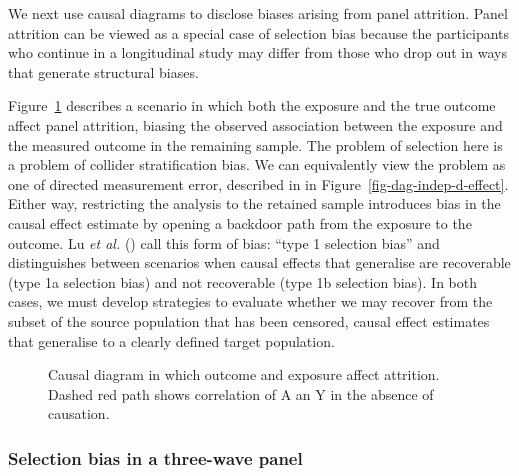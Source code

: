 \documentclass[
  singlecolumn]{article}
\begin{document}
We next use causal diagrams to disclose biases arising from panel
attrition. Panel attrition can be viewed as a special case of selection
bias because the participants who continue in a longitudinal study may
differ from those who drop out in ways that generate structural biases.

Figure~\ref{fig-dag-8-5} describes a scenario in which both the exposure
and the true outcome affect panel attrition, biasing the observed
association between the exposure and the measured outcome in the
remaining sample. The problem of selection here is a problem of collider
stratification bias. We can equivalently view the problem as one of
directed measurement error, described in in
Figure~\ref{fig-dag-indep-d-effect}. Either way, restricting the
analysis to the retained sample introduces bias in the causal effect
estimate by opening a backdoor path from the exposure to the outcome. Lu
\emph{et al.} () call this form of bias:
``type 1 selection bias'' and distinguishes between scenarios when
causal effects that generalise are recoverable (type 1a selection bias)
and not recoverable (type 1b selection bias). In both cases, we must
develop strategies to evaluate whether we may recover from the subset of
the source population that has been censored, causal effect estimates
that generalise to a clearly defined target population.

\begin{figure}


\caption{\label{fig-dag-8-5}Causal diagram in which outcome and exposure
affect attrition. Dashed red path shows correlation of A an Y in the
absence of causation.}

\end{figure}%

\subsubsection{Selection bias in a three-wave
panel}\label{selection-bias-in-a-three-wave-panel}
\end{document}
